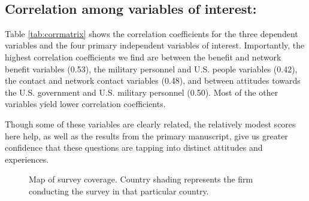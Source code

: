 \documentclass[12pt]{article}
\begin{document}
\begin{table}[th]
\caption{Correlation matrix of key variables} 
\label{tab:corrmatrix}
 \\ 
\end{table}

\subsection{Correlation among variables of interest:}

Table \ref{tab:corrmatrix} shows the correlation coefficients for the three dependent variables and the four primary independent variables of interest. Importantly, the highest correlation coefficients we find are between the benefit and network benefit variables (0.53), the military personnel and U.S. people variables (0.42), the contact and network contact variables (0.48), and between attitudes towards the U.S. government and U.S. military personnel (0.50). Most of the other variables yield lower correlation coefficients. 

Though some of these variables are clearly related, the relatively modest scores here help, as well as the results from the primary manuscript, give us greater confidence that these questions are tapping into distinct attitudes and experiences. 

\clearpage


\begin{figure}[th]
 \centering  {}
  \caption{Map of survey coverage. Country shading represents the firm conducting the survey in that particular country.}
 \label{fig:surveycoverage}
\end{figure}
\end{document}
